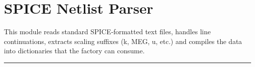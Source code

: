 \documentclass[letterpaper,10pt,english]{sphinxmanual}
\begin{document}
\sphinxstepscope


\chapter{SPICE Netlist Parser}
\label{\detokenize{parser:spice-netlist-parser}}\label{\detokenize{parser:netlist-parser-module}}\label{\detokenize{parser::doc}}
\sphinxAtStartPar
This module reads standard SPICE‑formatted text files, handles line continuations,
extracts scaling suffixes (k, MEG, u, etc.) and compiles the data into dictionaries that
the  factory can consume.


\bigskip\hrule\bigskip

\end{document}
